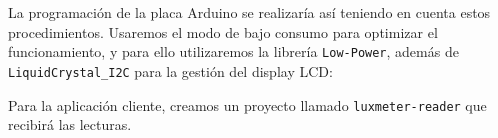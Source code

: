 La programación de la placa Arduino se realizaría así teniendo en cuenta estos
procedimientos. Usaremos el modo de bajo consumo para optimizar el
funcionamiento, y para ello utilizaremos la librería
\verb|Low-Power|\footnotemark, además de \verb|LiquidCrystal_I2C|\footnotemark
para la gestión del display LCD:





Para la aplicación cliente, creamos un proyecto llamado \verb|luxmeter-reader|
que recibirá las lecturas.




